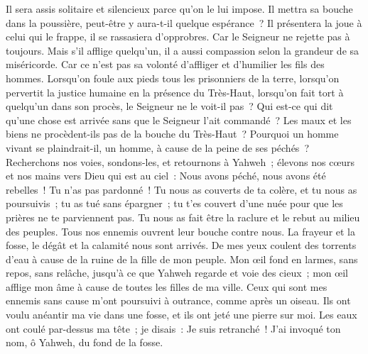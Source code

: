 \begin{multicols}{2}
 Il sera assis solitaire et silencieux parce qu'on le lui impose.
Il mettra sa bouche dans la poussière, peut-être y aura-t-il quelque espérance~?
Il présentera la joue à celui qui le frappe, il se rassasiera d'opprobres.
 Car le Seigneur ne rejette pas à toujours.
Mais s'il afflige quelqu'un, il a aussi compassion selon la grandeur de sa miséricorde.
Car ce n'est pas sa volonté d'affliger et d'humilier les fils des hommes.
 Lorsqu'on foule aux pieds tous les prisonniers de la terre,
lorsqu'on pervertit la justice humaine en la présence du Très-Haut,
lorsqu'on fait tort à quelqu'un dans son procès, le Seigneur ne le voit-il pas~?
 Qui est-ce qui dit qu'une chose est arrivée sans que le Seigneur l'ait commandé~?
Les maux et les biens ne procèdent-ils pas de la bouche du Très-Haut~?
Pourquoi un homme vivant se plaindrait-il, un homme, à cause de la peine de ses péchés~?
 Recherchons nos voies, sondons-les, et retournons à Yahweh~;
élevons nos cœurs et nos mains vers Dieu qui est au ciel~:
Nous avons péché, nous avons été rebelles~! Tu n'as pas pardonné~!
 Tu nous as couverts de ta colère, et tu nous as poursuivis~; tu as tué sans épargner~;
tu t'es couvert d'une nuée pour que les prières ne te parviennent pas.
Tu nous as fait être la raclure et le rebut au milieu des peuples.
 Tous nos ennemis ouvrent leur bouche contre nous.
La frayeur et la fosse, le dégât et la calamité nous sont arrivés.
De mes yeux coulent des torrents d'eau à cause de la ruine de la fille de mon peuple.
 Mon œil fond en larmes, sans repos, sans relâche,
jusqu'à ce que Yahweh regarde et voie des cieux~;
mon œil afflige mon âme à cause de toutes les filles de ma ville.
 Ceux qui sont mes ennemis sans cause m'ont poursuivi à outrance, comme après un oiseau.
Ils ont voulu anéantir ma vie dans une fosse, et ils ont jeté une pierre sur moi.
Les eaux ont coulé par-dessus ma tête~; je disais~: Je suis retranché~!
 J'ai invoqué ton nom, ô Yahweh, du fond de la fosse.

\end{multicols}
